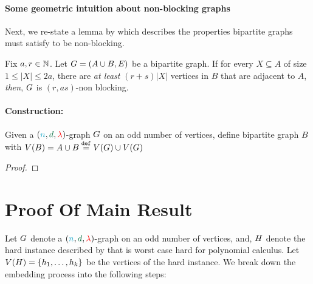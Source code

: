 \documentclass[11pt]{article}
\newcommand{\en}{\textcolor{ballblue}{n}}
\newcommand{\dee}{\textcolor{cadmiumgreen}{d}}
\newcommand{\eigen}{\textcolor{red}{\lambda}}
\newcommand{\EnDeeLambda}{(\en, \dee, \eigen)}
\begin{document}
\paragraph{Some geometric intuition about non-blocking graphs} \par


Next, we re-state a lemma by \citep[Proposition 1]{feldman1988wide} which describes the properties bipartite graphs must satisfy to be non-blocking.

\begin{lemma}
Fix $a, r \in \mathbb{N}$. Let $G = (A \cup B, E)$ be a bipartite graph.
If for every $X \subseteq A$ of size $1 \leq |X| \leq 2a$, there are \emph{at least} $(r + s)|X|$ vertices in $B$ that are adjacent to $A$, \emph{then}, $G$ is $(r, as)$-non blocking.
\end{lemma}

\paragraph{Construction:} Given a $\EnDeeLambda$-graph $G$ on an odd number of vertices, define bipartite graph $B$ with $V(B) = A \cup B \overset{\mathtt{def}}{=} V(G) \cup V(G)$

\begin{lemma}
	
\end{lemma}

\begin{proof}
	
\end{proof}

\section{Proof Of Main Result}


Let $G$ denote a $\EnDeeLambda$-graph on an odd number of vertices, and,  $H$ denote the hard instance described by  that is worst case hard for polynomial calculus.
Let $V(H) = \left\{ h_1, \dots, h_k\right\}$ be the vertices of the hard instance.
We break down the embedding process into the following steps:
\end{document}

